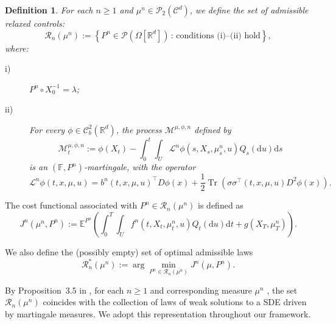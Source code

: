 \documentclass[11pt,amsfonts]{article}
\theoremstyle{plain}
\newtheorem{definition}{Definition}
\theoremstyle{assumpstyle}
\numberwithin{equation}{section}
\numberwithin{theorem}{section}
\numberwithin{proposition}{section}
\numberwithin{definition}{section}
\numberwithin{remark}{section}
\numberwithin{corollary}{section}
\numberwithin{lemma}{section}
\begin{document}
\begin{definition} \label{penalized-relaxed} 
For each $ n \geq 1 $ and $ \mu^n \in \mathcal{P}_2(\mathcal{C}^d) $, we define the set of admissible relaxed controls:
\begin{equation*}
\mathcal{R}_n(\mu^n) := \left\{ P^n \in \mathcal{P}(\Omega[\mathbb{R}^d]) \,:\, \text{conditions (i)–(ii) hold} \right\},
\end{equation*}
where:
\begin{description}
\item[i)] $ P^n \circ X_0^{-1} = \lambda $;
\item[ii)] For every $ \phi \in \mathcal{C}_b^2(\mathbb{R}^d) $, the process $ \mathcal{M}^{\mu, \phi, n} $ defined by
\begin{equation*}
\mathcal{M}^{\mu, \phi, n}_t := \phi(X_t) - \int_0^t \int_U \mathcal{L}^n \phi(s, X_s, \mu^n_s, u) Q_s(\mathrm{d}u) \mathrm{d}s
\end{equation*}
is an $(\mathbb{F}, P^n)$-martingale, with the operator
\begin{equation*}
\mathcal{L}^n \phi(t, x, \mu, u) = b^n(t, x, \mu, u)^\top D\phi(x) + \frac{1}{2} \operatorname{Tr} \left( \sigma \sigma^\top(t, x, \mu, u) D^2\phi(x) \right).
\end{equation*}
\end{description}
\end{definition}
The cost functional associated with $ P^n \in \mathcal{R}_n(\mu^n) $ is defined as
\begin{equation*}
J^n(\mu^n, P^n) := \mathbb{E}^{P^n} \left( \int_0^T \int_U f^n(t, X_t, \mu^n_t, u) Q_t(\mathrm{d}u) \mathrm{d}t + g(X_T, \mu^n_T) \right).
\end{equation*}

We also define the (possibly empty) set of optimal admissible laws
\begin{equation*}
\mathcal{R}_n^*(\mu^n) := \arg \min_{P^n \in \mathcal{R}_n(\mu^n)} J^n(\mu, P^n).
\end{equation*}

By Proposition~3.5 in \cite{laker}, for each $ n \geq 1 $  and corresponding measure $  \mu^n $ , 
the set $  \mathcal{R}_n(\mu^n) $  coincides with the collection of laws of weak solutions 
to a SDE driven by martingale measures. 
We adopt this representation throughout our framework.
\end{document}
